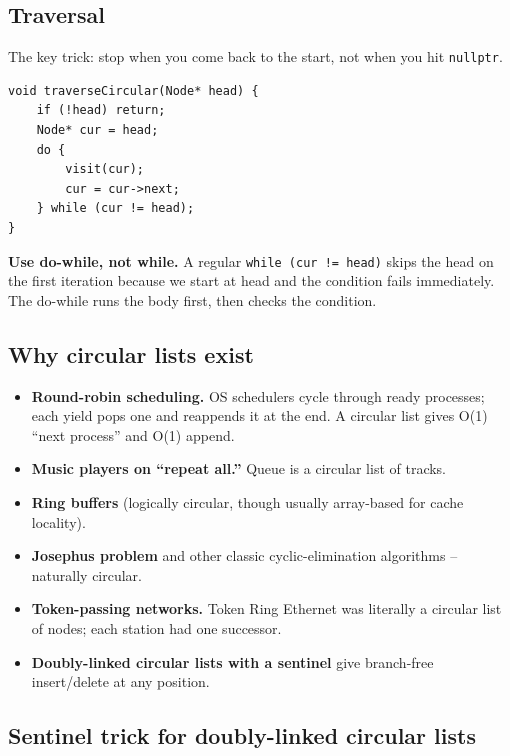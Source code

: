 \documentclass[11pt]{article}
\begin{document}
\subsection*{Traversal}

The key trick: stop when you come back to the start, not when you hit \texttt{nullptr}.

\begin{lstlisting}[basicstyle=\ttfamily\small,frame=single]
void traverseCircular(Node* head) {
    if (!head) return;
    Node* cur = head;
    do {
        visit(cur);
        cur = cur->next;
    } while (cur != head);
}
\end{lstlisting}

\begin{warnbox}
\textbf{Use do-while, not while.} A regular \texttt{while (cur != head)} skips the head on the first iteration because we start at head and the condition fails immediately. The do-while runs the body first, then checks the condition.
\end{warnbox}

\subsection*{Why circular lists exist}

\begin{itemize}[leftmargin=*]
    \item \textbf{Round-robin scheduling.} OS schedulers cycle through ready processes; each yield pops one and reappends it at the end. A circular list gives O(1) ``next process'' and O(1) append.
    \item \textbf{Music players on ``repeat all.''} Queue is a circular list of tracks.
    \item \textbf{Ring buffers} (logically circular, though usually array-based for cache locality).
    \item \textbf{Josephus problem} and other classic cyclic-elimination algorithms -- naturally circular.
    \item \textbf{Token-passing networks.} Token Ring Ethernet was literally a circular list of nodes; each station had one successor.
    \item \textbf{Doubly-linked circular lists with a sentinel} give branch-free insert/delete at any position.
\end{itemize}

\subsection*{Sentinel trick for doubly-linked circular lists}
\end{document}
